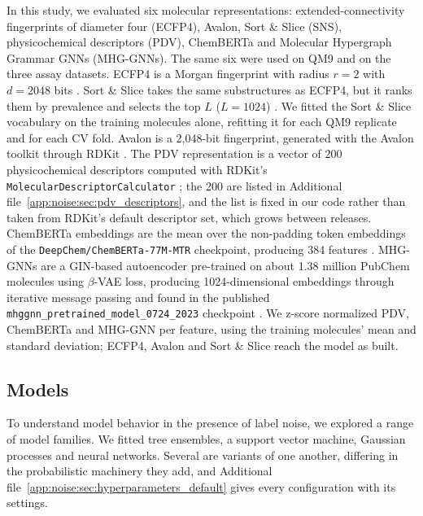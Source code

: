 In this study, we evaluated six molecular representations: extended-connectivity fingerprints of diameter four (ECFP4), Avalon, Sort \& Slice (SNS), physicochemical descriptors (PDV), ChemBERTa and Molecular Hypergraph Grammar GNNs (MHG-GNNs). The same six were used on QM9 and on the three assay datasets. ECFP4 is a Morgan fingerprint with radius $r = 2$ with $d = 2048$ bits \citep{rogers2010, rdkit}. Sort \& Slice takes the same substructures as ECFP4, but it ranks them by prevalence and selects the top $L$ ($L=1024$) \citep{sns}. We fitted the Sort \& Slice vocabulary on the training molecules alone, refitting it for each QM9 replicate and for each CV fold.  Avalon is a 2,048-bit fingerprint, generated with the Avalon toolkit through RDKit \citep{Gedeck2006, rdkit}. The PDV representation is a vector of 200 physicochemical descriptors computed with RDKit's \texttt{MolecularDescriptorCalculator} \citep{rdkit, Cherkasov2014}; the 200 are listed in Additional file~\ref{app:noise:sec:pdv_descriptors}, and the list is fixed in our code rather than taken from RDKit's default descriptor set, which grows between releases. ChemBERTa embeddings are the mean over the non-padding token embeddings of the \texttt{DeepChem/ChemBERTa-77M-MTR} checkpoint, producing 384 features \citep{Ahmad2022}. MHG-GNNs are a GIN-based autoencoder pre-trained on about 1.38 million PubChem molecules using $\beta$-VAE loss, producing 1024-dimensional embeddings through iterative message passing and found in the published \texttt{mhggnn\_pretrained\_model\_0724\_2023} checkpoint \citep{kishimoto2023}. We z-score normalized PDV, ChemBERTa and MHG-GNN per feature, using the training molecules' mean and standard deviation; ECFP4, Avalon and Sort \& Slice reach the model as built.

\subsection{Models}

To understand model behavior in the presence of label noise, we explored a range of model families. We fitted tree ensembles, a support vector machine, Gaussian processes and neural networks. Several are variants of one another, differing in the probabilistic machinery they add, and Additional file~\ref{app:noise:sec:hyperparameters_default} gives every configuration with its settings.

